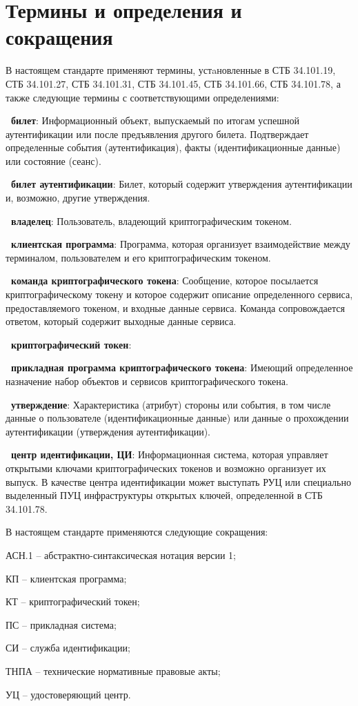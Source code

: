 \chapter{Термины и определения и сокращения}

В настоящем стандарте применяют термины, устaновленные 
в СТБ 34.101.19, СТБ 34.101.27, СТБ 34.101.31, СТБ 34.101.45, 
СТБ 34.101.66, СТБ 34.101.78, а также следующие термины с 
соответствующими определениями: 

{\bf \thedefctr~билет}:
Информационный объект, выпускаемый по итогам успешной аутентификации
или после предъявления другого билета. Подтверждает определенные 
события (аутентификация), факты (идентификационные данные) 
или состояние (сеанс). 

{\bf \thedefctr~билет аутентификации}:
Билет, который содержит утверждения аутентификации и, возможно, другие 
утверждения. 

{\bf \thedefctr~владелец}:
Пользователь, владеющий криптографическим токеном.

{\bf \thedefctr~клиентская программа}:
Программа, которая организует взаимодействие между терминалом, 
пользователем и его криптографическим токеном.

{\bf \thedefctr~команда криптографического токена}:
Сообщение, которое посылается 
криптографическому токену и которое содержит описание определенного 
сервиса, предоставляемого токеном, и входные данные сервиса. Команда 
сопровождается ответом, который содержит выходные данные сервиса. 


{\bf \thedefctr~криптографический токен}: 

{\bf \thedefctr~прикладная программа криптографического токена}:
Имеющий определенное 
назначение набор объектов и сервисов криптографического токена. 

{\bf \thedefctr~утверждение}:
Характеристика (атрибут) стороны или события, 
в том числе данные о пользователе (идентификационные данные) 
или данные о прохождении аутентификации (утверждения аутентификации).


{\bf \thedefctr~центр идентификации, ЦИ}:
Информационная система, которая управляет открытыми ключами
криптографических токенов и возможно организует их выпуск.
%
В качестве центра идентификации может выступать РУЦ или специально  
выделенный ПУЦ инфраструктуры открытых ключей, определенной в СТБ 
34.101.78.
\fi

В настоящем стандарте применяются следующие сокращения:

АСН.1 -- абстрактно-синтаксическая нотация версии 1;

КП -- клиентская программа;

КТ -- криптографический токен;

ПС -- прикладная система;

СИ -- служба идентификации;

ТНПА -- технические нормативные правовые акты;

УЦ -- удостоверяющий центр.



